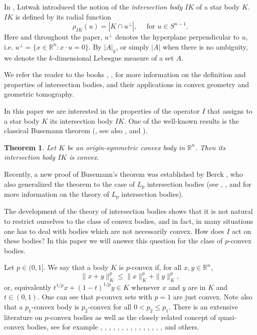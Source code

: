 \documentclass[12pt]{amsart} %
\newtheorem{theorem}{Theorem}
\renewcommand{\[}{\left[}
\renewcommand{\(}{\left(}
\renewcommand{\]}{\right]}
\renewcommand{\)}{\right)}
\renewcommand{\le}{\leqslant}
\newcommand{\R}{\mathbb R}              %
\begin{document}
In \cite{Lu1}, Lutwak introduced the notion of the {\em intersection body} $IK$ of a star body $K$. $IK$ is defined by its radial function $$\rho_{IK}(u)= |K\cap u^\bot| , \quad \mbox{ for   } u \in S^{n-1}.$$
Here and throughout the paper,   $u^\perp$ denotes the hyperplane perpendicular to $u$, i.e.
$ u^\perp=\{x\in \R^n: x\cdot u=0\}$.  By $|A|_k$, or simply $|A|$ when there is no ambiguity, we denote the $k$-dimensional Lebesgue measure of a set $A$.


We refer the reader to the books \cite{Ga2}, \cite{Ko}, \cite{KoY} for more information on the definition and properties of intersection bodies, and their applications in convex geometry and geometric tomography.

In this paper we are interested in the properties of the operator $I$ that assigns to a star body $K$ its intersection body $IK$.
One of the well-known results is the classical Busemann theorem   (\cite{Bu}, see also \cite{Ba1}, \cite{Ba2} and  \cite{MP}).

\begin{theorem}\label{th:Busemann} {
Let $K$ be an origin-symmetric convex body in $\R^n$. Then its intersection body $IK$ is convex.
}
\end{theorem}

Recently, a new  proof of Busemann's theorem
was established by Berck \cite{Be},  who also generalized the theorem to the case of  $L_p$ intersection bodies (see  \cite{GG}, \cite{HL},  \cite{YY} and  \cite{Ko} for more information on the theory of $L_p$ intersection bodies).


The development of the theory of intersection bodies shows that it is not natural to restrict ourselves to the class of convex bodies, and in fact, in many situations one has to deal with bodies which are not necessarily convex. How does $I$ act on these bodies?   In this paper we will answer this question for the class of $p$-convex bodies.



 Let $p\in (0,1]$. We say that a  body $K$ is
$p$-convex if, for all $x, y \in \R^n$,
$$
\|x+y\|^p_K \le \|x\|^p_K+\|y\|^p_K,
$$
or, equivalently $t^{1/p}x+(1-t)^{1/p}y \in K$ whenever $x$ and $y$
are in $K$ and $t\in (0,1)$. One can see that
 $p$-convex sets with $p=1$ are just convex. Note also that a $p_1$-convex body is $ p_2$-convex for all $0<p_2\le p_1$.
There is an extensive literature on $p$-convex bodies as well as the closely related concept of quasi-convex bodies, see for example \cite{A}, \cite{BBP1}, \cite{BBP2}, \cite{D}, \cite{GoK},  \cite{GoL}, \cite{GuL}, \cite{Ka}, \cite{KaT}, \cite{KaPR}, \cite{Li1}, \cite{Li2}, \cite{Li3}, \cite{LMP}, \cite{LMS}, \cite{M} and others.
\end{document}
